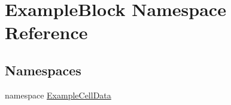 \hypertarget{namespace_example_block}{}\section{Example\+Block Namespace Reference}
\label{namespace_example_block}
\subsection*{Namespaces}
\begin{DoxyCompactItemize}
\item 
namespace \mbox{\hyperlink{namespace_example_block_1_1_example_cell_data}{Example\+Cell\+Data}}
\end{DoxyCompactItemize}
